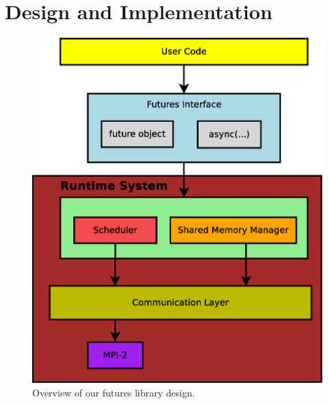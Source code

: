 \chapter{Design and Implementation}

\begin{figure}[here]
\center
\includegraphics[width=0.7\columnwidth]{figures/system_overview}
\caption{Overview of our futures library design.}
\label{fig:system_overview}
\end{figure}

